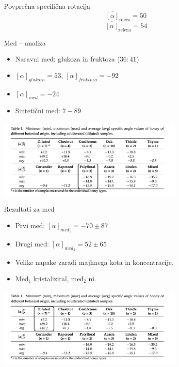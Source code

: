 \documentclass[slovene]{beamer}
\begin{document}
\begin{frame}{Povprečna specifična rotacija}
    \[
    \overline{[\alpha]}_{\text{rdeča}} = 50
    \]
    \[
    \overline{[\alpha]}_{\text{zelena}} = 54
    \]
\end{frame}

\begin{frame}{Med -- analiza}
    \begin{itemize}
        \item Naravni med: glukoza in fruktoza ($36:41$)
        \item $[\alpha]_{glukoza} = 53$, $[\alpha]_{fruktoza} = -92$
        \item $[\alpha]_{med} = -24$
        \item Sintetični med: $7 - 89$
    \end{itemize}
    \begin{center}
        \includegraphics[width=0.7\textwidth]{slike/med.png}
    \end{center}
\end{frame}

\begin{frame}{Rezultati za med}
    \begin{itemize}
        \item Prvi med: $[\alpha]_{med_1} = -70 \pm 87$
        \item Drugi med: $[\alpha]_{med_2} = 52 \pm 65$
        \item Velike napake zaradi majhnega kota in koncentracije.
        \item Med$_1$ kristaliziral, med$_2$ ni.
    \end{itemize}
    \begin{center}
        \includegraphics[width=0.7\textwidth]{slike/med2.png}
    \end{center}
\end{frame}
\end{document}
